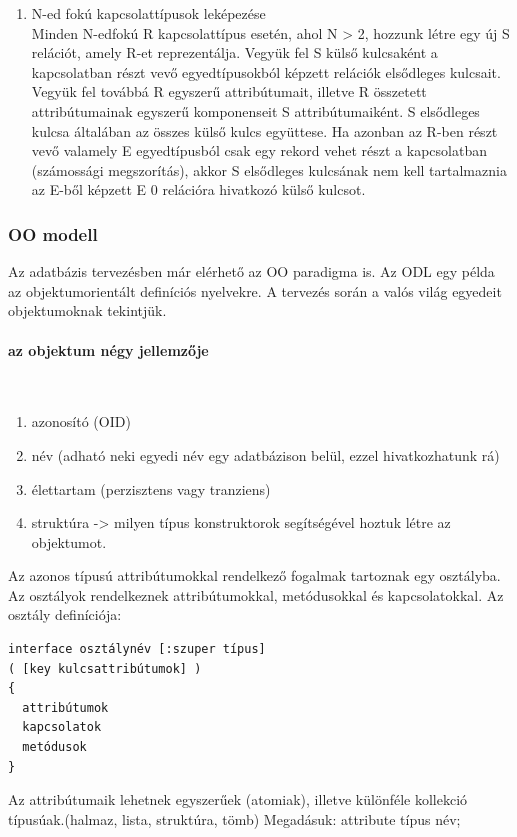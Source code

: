\begin{enumerate}[nosep]
	\item N-ed fokú kapcsolattípusok leképezése\\
	{\footnotesize Minden N-edfokú R kapcsolattípus esetén, ahol N > 2, hozzunk létre egy új S relációt, amely R-et reprezentálja. Vegyük fel S külső kulcsaként a kapcsolatban részt vevő egyedtípusokból képzett relációk elsődleges kulcsait. Vegyük fel továbbá R egyszerű attribútumait, illetve R összetett attribútumainak egyszerű komponenseit S attribútumaiként. S elsődleges kulcsa általában az összes külső kulcs együttese. Ha azonban az R-ben részt vevő valamely E egyedtípusból csak egy rekord vehet részt a kapcsolatban (számossági megszorítás), akkor S elsődleges kulcsának nem kell tartalmaznia az E-ből képzett E 0 relációra hivatkozó külső kulcsot.}
\end{enumerate}

\subsubsection{OO modell}
Az adatbázis tervezésben már elérhető az OO paradigma is. Az ODL egy példa az
objektumorientált definíciós nyelvekre. A tervezés során a valós világ egyedeit
objektumoknak tekintjük.
\paragraph{az objektum négy jellemzője}~\\
\begin{enumerate}[nosep]
	\item azonosító (OID)
	\item név (adható neki egyedi név egy adatbázison belül, ezzel hivatkozhatunk rá)
	\item élettartam (perzisztens vagy tranziens)
	\item struktúra -> milyen típus konstruktorok segítségével hoztuk létre az objektumot.
\end{enumerate}
Az azonos típusú attribútumokkal rendelkező fogalmak tartoznak egy osztályba. Az osztályok rendelkeznek attribútumokkal, metódusokkal és kapcsolatokkal. Az osztály definíciója:
\begin{verbatim}
interface osztálynév [:szuper típus]
( [key kulcsattribútumok] )
{
  attribútumok
  kapcsolatok
  metódusok
}
\end{verbatim}
Az attribútumaik lehetnek egyszerűek (atomiak), illetve különféle kollekció típusúak.(halmaz, lista, struktúra, tömb) Megadásuk: attribute típus név;

